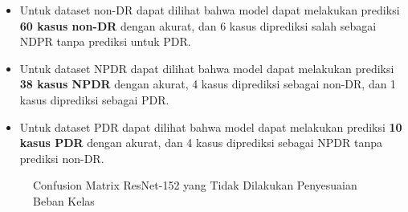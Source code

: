 \begin{itemize}
	\item Untuk dataset non-DR dapat dilihat bahwa model dapat melakukan prediksi \textbf{60 kasus non-DR} dengan akurat, dan 6 kasus diprediksi salah sebagai NDPR tanpa prediksi untuk PDR.
	
	\item Untuk dataset NPDR dapat dilihat bahwa model dapat melakukan prediksi \textbf{38 kasus NPDR} dengan akurat, 4 kasus diprediksi sebagai non-DR, dan 1 kasus diprediksi sebagai PDR.
	
	\item Untuk dataset PDR dapat dilihat bahwa model dapat melakukan prediksi \textbf{10 kasus PDR} dengan akurat, dan 4 kasus diprediksi sebagai NPDR tanpa prediksi non-DR.
\end{itemize}
\pagebreak

\begin{figure}[hbtp]
	\centering
	\qquad
	\qquad
	\caption{Confusion Matrix ResNet-152 yang Tidak Dilakukan Penyesuaian Beban Kelas}
	\label{fig:confRes152}
\end{figure}
\FloatBarrier

